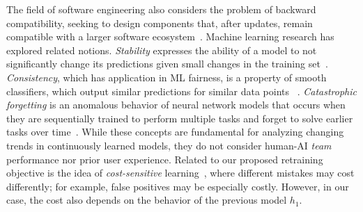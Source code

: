 \documentclass[letterpaper]{article} %
\newcommand{\?}{\mbox{?}}
\newcommand{\hone}{\mbox{$h_1$}}
\begin{document}
The field of software engineering also considers the problem of backward compatibility, seeking to design components that, after  updates, remain compatible with a larger software ecosystem~\cite{bosch2009software,spring2005techniques,tsantilis2009method}.
Machine learning research has explored related notions. {\em Stability} expresses the ability of a model to not significantly change its predictions given  small changes in the training set~\cite{bousquet2001algorithmic}. {\em Consistency}, which has application in ML fairness, is a property of smooth classifiers, which output similar predictions for similar data points
~\cite{zhou2004learning}. %
\emph{Catastrophic forgetting} is an anomalous behavior of neural network models that occurs when they are sequentially trained to perform multiple tasks and forget to solve earlier tasks over time~\cite{kirkpatrick2017overcoming}. 
While  these concepts are fundamental for analyzing changing trends in continuously learned models, they do not consider human-AI {\em team} performance nor prior user experience. Related to our proposed retraining objective is the idea of \emph{cost-sensitive} learning~\cite{elkan2001foundations}, where different mistakes may cost differently; for example, false positives may be especially costly. However, in our case, the cost also depends on the behavior of the previous model $\hone$.
\end{document}
